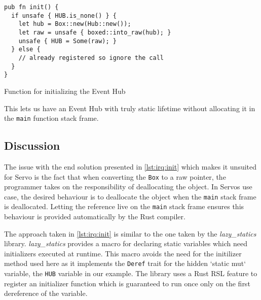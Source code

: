 \begin{listing}[H]
  \begin{verbatim}
pub fn init() {
  if unsafe { HUB.is_none() } {
    let hub = Box::new(Hub::new());
    let raw = unsafe { boxed::into_raw(hub); }
    unsafe { HUB = Some(raw); }
  } else {
    // already registered so ignore the call
  }
}
  \end{verbatim}
  \caption{Function for initializing the Event Hub}
  \label{lst:irq:init}
\end{listing}

This lets us have an Event Hub with truly static lifetime without allocating it in the \texttt{main} function stack frame.

\subsection{Discussion}

The issue with the end solution presented in \autoref{lst:irq:init} which makes it unsuited for Servo is the fact that when converting the \texttt{Box} to a raw pointer, the programmer takes on the responsibility of deallocating the object.
In Servos use case, the desired behaviour is to deallocate the object when the \texttt{main} stack frame is deallocated.
Letting the reference live on the \texttt{main} stack frame ensures this behaviour is provided automatically by the Rust compiler.

The approach taken in \autoref{lst:irq:init} is similar to the one taken by the \textit{lazy\_statics} \cite{web:lazy_statics} library.
\textit{lazy\_statics} provides a macro for declaring static variables which need initializers executed at runtime.
This macro avoids the need for the initilizer method used here as it implements the \texttt{Deref} trait for the hidden `static mut` variable, the \texttt{HUB} variable in our example.
The library uses a Rust RSL feature to register an initializer function which is guaranteed to run once only on the first dereference of the variable.
